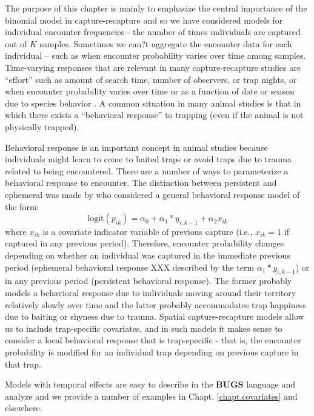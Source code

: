 The purpose of this chapter is mainly to emphasize the central
importance of the binomial model in capture-recapture and so we have
considered models for individual encounter frequencies - the number of
times individuals are captured out of $K$ samples.  Sometimes we can?t aggregate the encounter data for each individual --
such as when encounter probability varies over time among samples. 
Time-varying responses that are relevant in many
capture-recapture studies are ``effort'' such as amount of search time,
number of observers, or trap nights, or when encounter probability
varies over time or as a function of date or season due to species behavior
\citep{kery_etal:2010}.
  A common situation in many animal studies is that in
which there exists a ``behavioral response'' to trapping (even if the
animal is not physically trapped). 

Behavioral response is an important concept in animal studies
because individuals might learn to come to baited traps or avoid traps
due to trauma related to being encountered.  There are a number of
ways to parameterize a behavioral response to encounter. The
distinction between persistent and ephemeral was made by
\citet{yang_chao:2005} who considered a general behavioral response
model of the form:
\[
\mbox{logit}(p_{ik}) = \alpha_{0} + \alpha_{1}*y_{i,k-1} + \alpha_{2} x_{ik}
\]
where $x_{ik}$ is a covariate indicator variable of previous capture
(i.e., $x_{ik} = 1$ if captured in any previous period). Therefore,
encounter probability changes depending on whether an individual was
captured in the immediate previous period (ephemeral behavioral
response XXX described by the term $\alpha_{1}*y_{i,k-1}$) or in any previous period (persistent behavioral
response). The former probably models a behavioral response due to
individuals moving around their territory relatively slowly over time
and the latter probably accommodates trap happiness due to baiting or
shyness due to trauma.  Spatial capture-recapture models allow us to 
include trap-specific covariates, and in such models it makes
sense to consider a local behavioral response that is trap-specific
\citep{royle_etal:2011jwm} - that is, the encounter probability is
modified for an individual trap depending on previous capture in
that trap.

Models with temporal effects are easy to describe in the {\bf BUGS} language
and analyze and we provide a number of examples in
Chapt. \ref{chapt.covariates} and elsewhere. 


